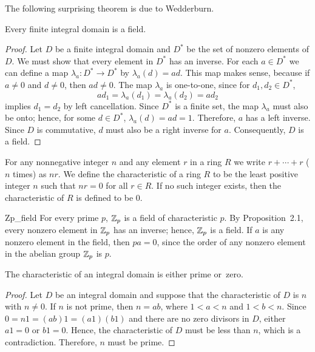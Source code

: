  
The following surprising theorem is due to Wedderburn.
 
 
\begin{theorem}
Every finite integral domain is a field.
\end{theorem}
 
 
\begin{proof}
Let $D$ be a finite integral domain and $D^\ast$ be the set of nonzero
elements of $D$.  We must show that every element in $D^*$ has an
inverse. For each $a \in D^\ast$ we can define a map $\lambda_a :
D^\ast \rightarrow D^\ast$ by $\lambda_a(d) = ad$.  This map makes
sense, because if  $a \neq 0$ and $d \neq 0$, then $ad \neq 0$.  The map
$\lambda_a$ is one-to-one, since for $d_1, d_2 \in D^*$, 
\[
ad_1 = \lambda_a(d_1) = \lambda_a(d_2) = ad_2
\]
implies $d_1 = d_2$ by left cancellation. Since $D^\ast$ is a finite
set, the map $\lambda_a$ must also be onto; hence, for some $d \in
D^\ast$, $\lambda_a(d) = ad = 1$. Therefore, $a$ has a left inverse.
Since $D$ is commutative, $d$ must also be a right inverse for $a$.
Consequently, $D$ is a field. 
\end{proof}
 
 
\medskip
 
 
For any nonnegative integer $n$ and any element $r$ in a ring $R$ we 
write $r + \cdots + r$ ($n$ times) as $nr$. We  define the {\bfi
characteristic\/}\label{ringchar} of a ring $R$ to 
be the least positive integer $n$ such that $nr=0$ for all $r \in R$.
If no such integer exists, then the characteristic of $R$ is defined
to be 0.  
 
 
\begin{example}{Zp_field}
For every prime $p$, ${\Bbb Z}_p$ is a field of characteristic $p$. By
Proposition~2.1, every nonzero element in ${\Bbb Z}_p$ has an inverse;
hence, ${\Bbb Z}_p$ is a field. If $a$ is any nonzero element in the
field, then $pa =0$, since the order of any nonzero element in the
abelian group ${\Bbb Z}_p$ is $p$. 
\end{example}
 
 
\begin{theorem}
The characteristic of an integral domain is either prime or~zero.
\end{theorem}
 
 
\begin{proof}
Let $D$ be an integral domain and suppose that the characteristic of
$D$ is $n$ with $n \neq 0$. If $n$ is not prime, then $n = ab$, where
$1 < a <n$ and $1 < b < n$. Since $0 = n 1 = (ab)1 = (a1)(b1)$ and
there are no zero divisors in $D$, either $a1 =0$ or $b1=0$. Hence,
the characteristic of $D$ must be less than $n$, which is a
contradiction.  Therefore, $n$ must be prime. 
\end{proof}
 
